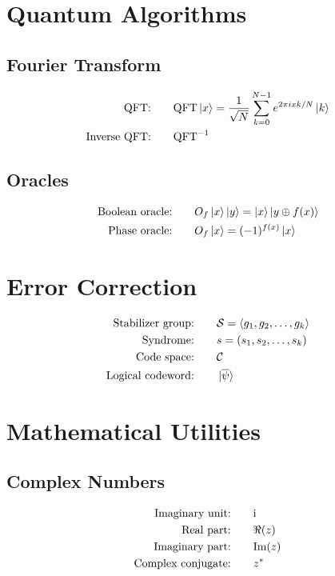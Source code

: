 \documentclass[12pt]{article}
\newcommand{\QFT}{\text{QFT}}
\newcommand{\iQFT}{\text{QFT}^{-1}}
\newcommand{\oraclef}{O_f}
\newcommand{\stab}{\mathcal{S}}
\newcommand{\syndrome}{s}
\newcommand{\codespace}{\mathcal{C}}
\newcommand{\codeword}{\ket{\overline{\psi}}}
\newcommand{\ii}{\mathrm{i}}
\newcommand{\imag}{\text{Im}}
\newcommand{\conj}[1]{#1^*}
\theoremstyle{definition}
\theoremstyle{remark}
\begin{document}
\begin{multicols}{2}
\section{Quantum Algorithms}

\subsection{Fourier Transform}
\begin{alignat}{2}
\text{QFT:}         &\quad && \QFT\ket{x} = \frac{1}{\sqrt{N}} \sum_{k=0}^{N-1} e^{2\pi i xk/N}\ket{k} \\
\text{Inverse QFT:} &\quad && \iQFT
\end{alignat}

\subsection{Oracles}
\begin{alignat}{2}
\text{Boolean oracle:} &\quad && \oraclef\ket{x}\ket{y} = \ket{x}\ket{y \oplus f(x)} \\
\text{Phase oracle:}   &\quad && \oraclef\ket{x} = (-1)^{f(x)}\ket{x}
\end{alignat}

\section{Error Correction}

\begin{alignat}{2}
\text{Stabilizer group:}  &\quad && \stab = \langle g_1, g_2, \ldots, g_k \rangle \\
\text{Syndrome:}          &\quad && \syndrome = (s_1, s_2, \ldots, s_k) \\
\text{Code space:}        &\quad && \codespace \\
\text{Logical codeword:}  &\quad && \codeword
\end{alignat}


\section{Mathematical Utilities}

\subsection{Complex Numbers}
\begin{alignat}{2}
\text{Imaginary unit:}     &\quad && \ii \\
\text{Real part:}          &\quad && \real(z) \\
\text{Imaginary part:}     &\quad && \imag(z) \\
\text{Complex conjugate:}  &\quad && \conj{z}
\end{alignat}


\end{multicols}
\end{document}
